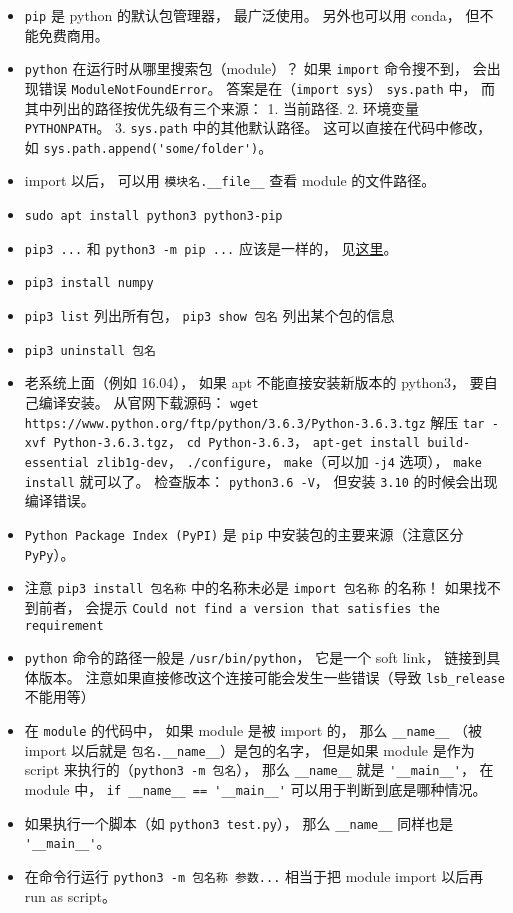 

\begin{itemize}
\item \verb|pip| 是 python 的默认包管理器， 最广泛使用。 另外也可以用 conda， 但不能免费商用。
\item \verb|python| 在运行时从哪里搜索包（module）？ 如果 \verb|import| 命令搜不到， 会出现错误 \verb|ModuleNotFoundError|。 答案是在（\verb|import sys|） \verb|sys.path| 中， 而其中列出的路径按优先级有三个来源： 1. 当前路径. 2. 环境变量 \verb|PYTHONPATH|。 3. \verb|sys.path| 中的其他默认路径。 这可以直接在代码中修改， 如 \verb|sys.path.append('some/folder')|。
\item import 以后， 可以用 \verb|模块名.__file__| 查看 module 的文件路径。
\item \verb|sudo apt install python3 python3-pip|
\item \verb|pip3 ...| 和 \verb|python3 -m pip ...| 应该是一样的， 见\href{https://stackoverflow.com/questions/41307101/difference-between-pip3-and-python3-m-pip}{这里}。
\item \verb|pip3 install numpy|
\item \verb|pip3 list| 列出所有包， \verb|pip3 show 包名| 列出某个包的信息
\item \verb|pip3 uninstall 包名|
\item 老系统上面（例如 16.04）， 如果 apt 不能直接安装新版本的 python3， 要自己编译安装。 从官网下载源码： \verb|wget https://www.python.org/ftp/python/3.6.3/Python-3.6.3.tgz| 解压 \verb|tar -xvf Python-3.6.3.tgz|， \verb|cd Python-3.6.3|， \verb|apt-get install build-essential zlib1g-dev|， \verb|./configure|， \verb|make|（可以加 \verb|-j4| 选项）， \verb|make install| 就可以了。 检查版本： \verb|python3.6 -V|， 但安装 \verb|3.10| 的时候会出现编译错误。
\item \verb|Python Package Index (PyPI)| 是 \verb|pip| 中安装包的主要来源（注意区分 \verb|PyPy|）。
\item 注意 \verb|pip3 install 包名称| 中的名称未必是 \verb|import 包名称| 的名称！ 如果找不到前者， 会提示 \verb|Could not find a version that satisfies the requirement|
\item \verb|python| 命令的路径一般是 \verb|/usr/bin/python|， 它是一个 soft link， 链接到具体版本。 注意如果直接修改这个连接可能会发生一些错误（导致 \verb|lsb_release| 不能用等）
\item 在 \verb|module| 的代码中， 如果 module 是被 import 的， 那么 \verb|__name__| （被 import 以后就是 \verb|包名.__name__|）是包的名字， 但是如果 module 是作为 script 来执行的（\verb|python3 -m 包名|）， 那么 \verb|__name__| 就是 \verb|'__main__'|， 在 module 中， \verb|if __name__ == '__main__'| 可以用于判断到底是哪种情况。
\item 如果执行一个脚本（如 \verb|python3 test.py|）， 那么 \verb|__name__| 同样也是 \verb|'__main__'|。
\item 在命令行运行 \verb|python3 -m 包名称 参数...| 相当于把 module import 以后再 run as script。
\end{itemize}
